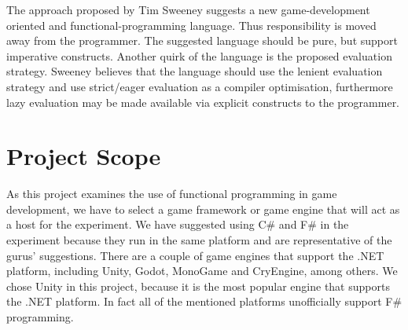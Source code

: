 
The approach proposed by Tim Sweeney suggests a new game-development oriented and functional-programming language\cite{theNextMainstreanProgrammingLanguage}. Thus responsibility is moved away from the programmer. The suggested language should be pure, but support imperative constructs. Another quirk of the language is the proposed evaluation strategy. Sweeney believes that the language should use the lenient evaluation strategy and use strict/eager evaluation as a compiler optimisation, furthermore lazy evaluation may be made available via explicit constructs to the programmer.



\section{Project Scope}
As this project examines the use of functional programming in game development, we have to select a game framework or game engine that will act as a host for the experiment. We have suggested using C\# and F\# in the experiment because they run in the same platform and are representative of the gurus' suggestions. There are a couple of game engines that support the .NET platform, including Unity, Godot, MonoGame and CryEngine, among others\cite{p92018gameplay}. We chose Unity in this project, because it is the most popular engine that supports the .NET platform\cite{game:engine:popularity}. In fact all of the mentioned platforms unofficially support F\# programming\cite{godot:fsharp,monogame:fsharp,cryengine:fsharp}.
